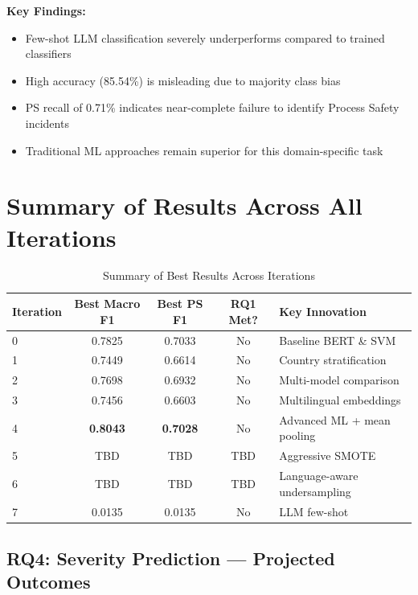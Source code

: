 \documentclass[11pt, titlepage, bibliography=totoc]{scrreprt}
\begin{document}
\textbf{Key Findings:}
\begin{itemize}
    \item Few-shot LLM classification severely underperforms compared to trained classifiers
    \item High accuracy (85.54\%) is misleading due to majority class bias
    \item PS recall of 0.71\% indicates near-complete failure to identify Process Safety incidents
    \item Traditional ML approaches remain superior for this domain-specific task
\end{itemize}

\section{Summary of Results Across All Iterations}

\begin{table}[htbp]
\centering
\caption{Summary of Best Results Across Iterations}
\label{tab:results-summary}
\begin{tabular}{@{}lcccp{4cm}@{}}
\toprule
\textbf{Iteration} & \textbf{Best Macro F1} & \textbf{Best PS F1} & \textbf{RQ1 Met?} & \textbf{Key Innovation} \\
\midrule
0 & 0.7825 & 0.7033 & No & Baseline BERT \& SVM \\
1 & 0.7449 & 0.6614 & No & Country stratification \\
2 & 0.7698 & 0.6932 & No & Multi-model comparison \\
3 & 0.7456 & 0.6603 & No & Multilingual embeddings \\
4 & \textbf{0.8043} & \textbf{0.7028} & No & Advanced ML + mean pooling \\
5 & TBD   & TBD   & TBD & Aggressive SMOTE \\
6 & TBD   & TBD   & TBD & Language-aware undersampling \\
7 & 0.0135 & 0.0135 & No & LLM few-shot \\
\bottomrule
\end{tabular}
\end{table}

\subsection{RQ4: Severity Prediction --- Projected Outcomes}
\label{sec:rq4_results}
\end{document}
